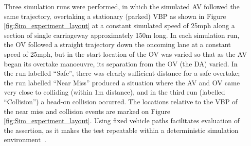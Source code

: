 Three simulation runs were performed, in which the simulated AV followed the same trajectory, overtaking a stationary (parked) VBP as shown in Figure \ref{fig:Sim_experiment_layout} at a constant simulated speed of 25mph along a section of single carriageway approximately 150m long. In each simulation run, the OV followed a straight trajectory down the oncoming lane at a constant speed of 25mph, but in the start location of the OV was varied so that as the AV began its overtake manoeuvre, its separation from the OV (the DA) varied. In the run labelled ``Safe'', there was clearly sufficient distance for a safe overtake; the run labelled ``Near Miss'' produced a situation where the AV and OV came very close to colliding (within 1m distance), and in the third run (labelled ``Collision'') a head-on collision occurred. The locations  relative to the VBP of the near miss and collision events are marked on Figure \ref{fig:Sim_experiment_layout}.
Using fixed vehicle paths facilitates evaluation of the assertion, as it makes the test repeatable within a deterministic simulation environment~\cite{chance2021}. 

%





